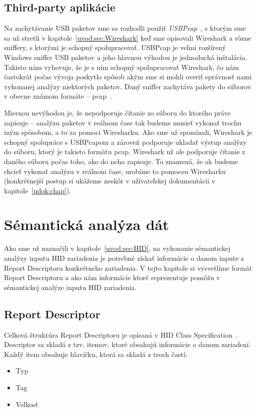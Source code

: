 \subsection{Third-party aplikácie}
\label{kap03:third_party}
Na zachytávanie USB paketov sme sa rozhodli použiť \textit{USBPcap}~\cite{usbpcap}, s ktorým sme sa už stretli v kapitole~\ref{uvod:sec:Wireshark} keď sme opisovali Wireshark a rôzne sniffery, s ktorými je schopný spolupracovať. USBPcap je veľmi rozšírený Windows sniffer USB paketov a jeho hlavnou výhodou je jednoduchá inštalácia. Takisto nám vyhovuje, že je s ním schopný spolupracovať Wireshark, čo nám častokrát počas vývoja poskytlo spôsob akým sme si mohli overiť správnosť nami vykonanej analýzy niektorých paketov. Daný sniffer zachytáva pakety do súborov v obecne známom formáte -- pcap~\cite{pcap}. 

Miernou nevýhodou je, že nepodporuje čítanie zo súboru do ktorého práve zapisuje -- analýzu paketov v reálnom čase tak budeme musieť vykonať trochu iným spôsobom, a to za pomoci Wiresharku. Ako sme už spomínali, Wireshark je schopný spolupráce s USBPcapom a zároveň podporuje ukladať výstup analýzy do súboru, ktorý je takisto formátu pcap. Wireshark už ale podporuje čítanie z daného súboru počas toho, ako do neho zapisuje. To znamená, že ak budeme chcieť vykonať analýzu v reálnom čase, urobíme to pomocou Wiresharku (konkrétnejší postup si ukážeme neskôr v užívateľskej dokumentácii v kapitole~\ref{udok:chap}).



\section{Sémantická analýza dát}
Ako sme už naznačili v kapitole~\ref{uvod:sec:HID}, na vykonanie sémantickej analýzy inputu HID zariadenia je potrebné získať informácie o danom inpute z Report Descriptoru konkrétneho zariadenia. V tejto kapitole si vysvetlíme formát Report Descriptoru a ako nám informácie ktoré reprezentuje pomôžu v sémantickej analýze inputu HID zariadenia.

\subsection{Report Descriptor}
Celková štruktúra Report Descriptoru je opísaná v HID Class Specification~\cite{report_desc}. Descriptor sa skladá z tzv. itemov, ktoré obsahujú informácie o danom zariadení. Každý item obsahuje hlavičku, ktorá sa skladá z troch častí:
\begin{itemize}
\item Typ
\item Tag
\item Veľkosť
\end{itemize}

